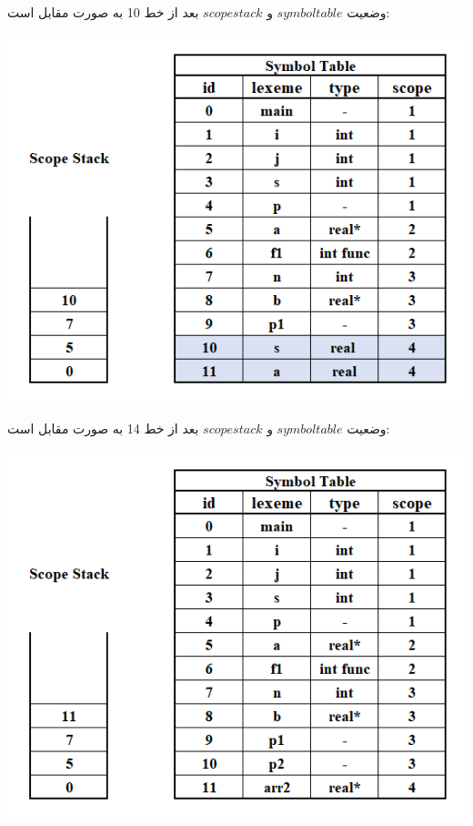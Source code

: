 وضعیت $symbol table$ و $scope stack$ بعد از خط 10 به صورت مقابل است:

\qquad\qquad\includegraphics[width=0.6\linewidth]{figs/5.png}

وضعیت $symbol table$ و $scope stack$ بعد از خط 14 به صورت مقابل است:

\qquad\qquad\includegraphics[width=0.6\linewidth]{figs/6.png}
